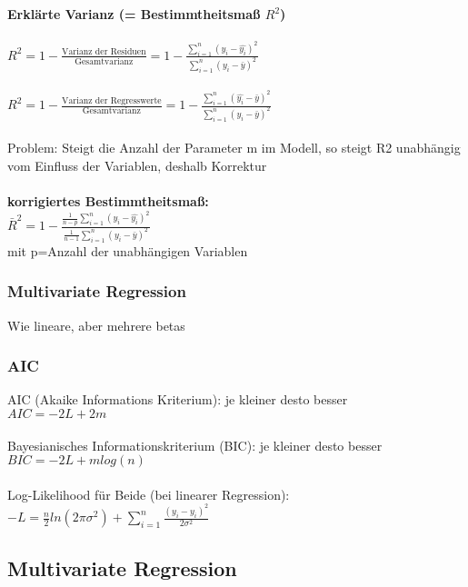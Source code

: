 \newpage
\textbf{Erklärte Varianz (= Bestimmtheitsmaß $R^2$)}\\\\
$R^2= 1 - \displaystyle \frac{\text{Varianz der Residuen}}{\text{Gesamtvarianz}} =1- \frac{\displaystyle\sum_{i=1}^{n} (y_i - \hat{y_i})^2}{\displaystyle \sum_{i=1}^{n} (y_i - \bar{y})^2}$\\\\
$\displaystyle R^2= 1 - \frac{\text{Varianz der Regresswerte}}{\text{Gesamtvarianz}} = 1 - \frac{\displaystyle \sum_{i=1}^{n} (\hat{y_i} - \bar{y})^2}{\displaystyle \sum_{i=1}^{n} (y_i - \bar{y})^2}$
\\\\
Problem: Steigt die Anzahl der Parameter m im Modell, so steigt R2 unabhängig vom Einfluss der Variablen, deshalb Korrektur\\\\
\textbf{korrigiertes Bestimmtheitsmaß:}\\
$\bar{R}^2=1- \frac{\displaystyle \frac{1}{n-p} \displaystyle\sum_{i=1}^{n} (y_i - \hat{y_i})^2}{\displaystyle \frac{1}{n-1} \displaystyle \sum_{i=1}^{n} (y_i - \bar{y})^2}$\\
mit p=Anzahl der unabhängigen Variablen

\subsubsection{Multivariate Regression}
Wie lineare, aber mehrere betas

\subsubsection{AIC}
AIC (Akaike Informations Kriterium): je kleiner desto besser\\
$AIC=-2L+2m$
\\\\
Bayesianisches Informationskriterium (BIC): je kleiner desto besser\\
$BIC=-2L+mlog(n)$
\\\\
Log-Likelihood für Beide (bei linearer Regression):\\
$-L=\displaystyle \frac{n}{2}ln(2\pi \sigma^2) + \displaystyle \sum_{i=1}^{n} \frac{(\hat{y_i} - y_i)^2}{2\sigma^2}$\\

\subsection{Multivariate Regression}

